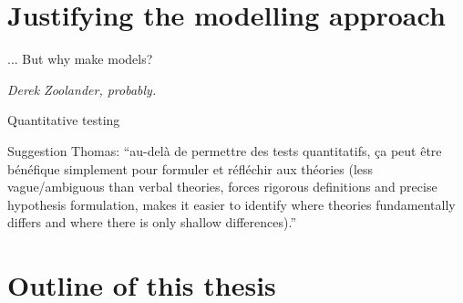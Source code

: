 \section{Justifying the modelling approach}
\epigraph{... But why make models?}{\textit{Derek Zoolander, probably.}}
Quantitative testing $~$

Suggestion Thomas: ``au-delà de permettre des tests quantitatifs, ça peut être bénéfique simplement pour formuler et réfléchir aux théories (less vague/ambiguous than verbal theories, forces rigorous definitions and precise hypothesis formulation, makes it easier to identify where theories fundamentally differs and where there is only shallow differences).''
\section{Outline of this thesis}





